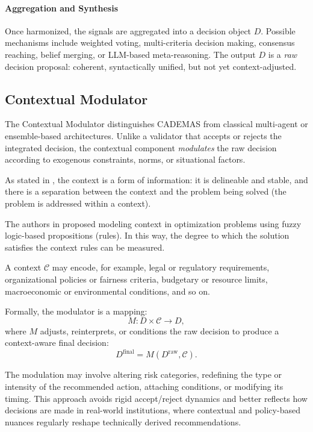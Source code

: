 \documentclass[letterpaper, 10 pt,conference]{IEEEconf}
\begin{document}
\paragraph*{Aggregation and Synthesis}
Once harmonized, the signals are aggregated into a decision object $D$. Possible mechanisms include weighted voting, multi-criteria decision making, consensus reaching, belief merging, or LLM-based meta-reasoning. The output $D$ is a \emph{raw} decision proposal: coherent, syntactically unified, but not yet context-adjusted.

\subsection{Contextual Modulator}

The Contextual Modulator distinguishes CADEMAS from classical 
multi-agent or ensemble-based architectures. Unlike a validator that 
accepts or rejects the integrated decision, the contextual component 
\emph{modulates} the raw decision according to exogenous constraints, norms,
or situational factors. 

As stated in \cite{Dourish2004}, the context is a form of information: it is delineable and stable, and there is a separation between the context and the problem being solved (the problem is addressed within a context).
    
The authors in \cite{PerezCanedo2022} proposed modeling context in optimization problems using fuzzy logic-based propositions (rules). In this way, the degree to which the solution satisfies the context rules can be measured. 

A context $\mathcal{C}$ may encode, for example, legal or regulatory requirements, organizational policies or fairness criteria, budgetary or resource limits, macroeconomic or environmental conditions, and so on.


Formally, the modulator is a mapping:
\[
    M : D \times \mathcal{C} \rightarrow D,
\]
where $M$ adjusts, reinterprets, or conditions the raw decision to produce 
a context-aware final decision:
\[
    D^{\text{final}} = M(D^{\text{raw}}, \mathcal{C}).
\]

The modulation may involve altering risk categories, redefining the type or intensity of the recommended action, attaching conditions, or modifying its timing. This approach avoids rigid accept/reject dynamics and better reflects how decisions are made in real-world institutions, where contextual and policy-based nuances regularly reshape technically derived recommendations.
\end{document}
